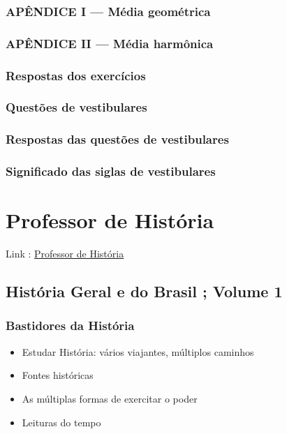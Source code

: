 \documentclass[a4paper,12pt]{article}[abntex2]
\begin{document}
\subsubsection*{APÊNDICE I — Média geométrica}

\subsubsection*{APÊNDICE II — Média harmônica}

\subsubsection*{Respostas dos exercícios}

\subsubsection*{Questões de vestibulares}

\subsubsection*{Respostas das questões de vestibulares}

\subsubsection*{Significado das siglas de vestibulares}

\newpage

\section{\textbf{Professor de História}}

Link : \href{https://chatgpt.com/g/g-0azinr48l-professor-historia}{Professor de História}

\subsection{História Geral e do Brasil ; Volume 1}
\subsubsection*{Bastidores da História}

\begin{itemize}
\item Estudar História: vários viajantes, múltiplos caminhos
\item Fontes históricas
\item As múltiplas formas de exercitar o poder
\item Leituras do tempo
\end{itemize}
\end{document}
